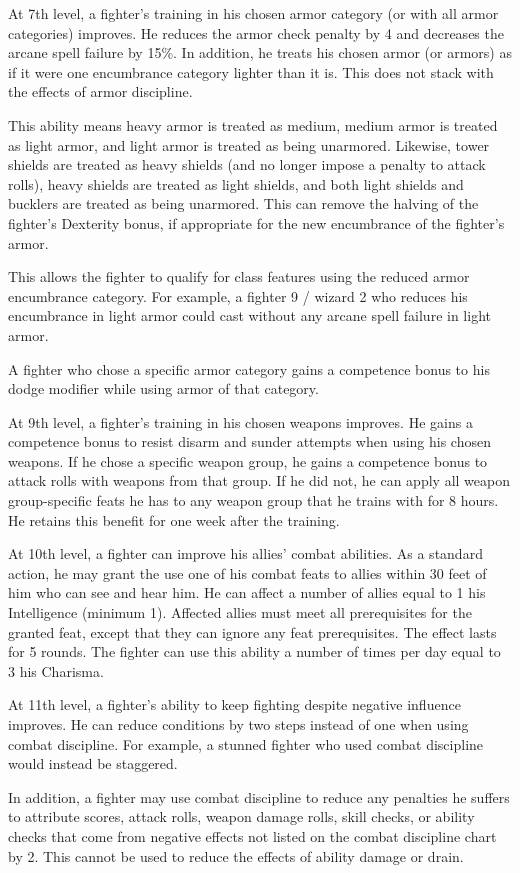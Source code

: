  At 7th level, a fighter's training in his chosen armor category (or with all armor categories) improves. He reduces the armor check penalty by 4 and decreases the arcane spell failure by 15\%. In addition, he treats his chosen armor (or armors) as if it were one encumbrance category lighter than it is. This does not stack with the effects of armor discipline.
\par This ability means heavy armor is treated as medium, medium armor is treated as light armor, and light armor is treated as being unarmored. Likewise, tower shields are treated as heavy shields (and no longer impose a  penalty to attack rolls), heavy shields are treated as light shields, and both light shields and bucklers are treated as being unarmored. This can remove the halving of the fighter's Dexterity bonus, if appropriate for the new encumbrance of the fighter's armor.
\par This allows the fighter to qualify for class features using the reduced armor encumbrance category. For example, a fighter 9 / wizard 2 who reduces his encumbrance in light armor could cast without any arcane spell failure in light armor.
\par A fighter who chose a specific armor category gains a  competence bonus to his dodge modifier while using armor of that category.

 At 9th level, a fighter's training in his chosen weapons improves. He gains a  competence bonus to resist disarm and sunder attempts when using his chosen weapons. If he chose a specific weapon group, he gains a  competence bonus to attack rolls with weapons from that group. If he did not, he can apply all weapon group-specific feats he has to any weapon group that he trains with for 8 hours. He retains this benefit for one week after the training.

 At 10th level, a fighter can improve his allies' combat abilities. As a standard action, he may grant the use one of his combat feats to allies within 30 feet of him who can see and hear him. He can affect a number of allies equal to 1 \add his Intelligence (minimum 1). Affected allies must meet all prerequisites for the granted feat, except that they can ignore any feat prerequisites. The effect lasts for 5 rounds. The fighter can use this ability a number of times per day equal to 3 \add his Charisma.

 At 11th level, a fighter's ability to keep fighting despite negative influence improves. He can reduce conditions by two steps instead of one when using combat discipline. For example, a stunned fighter who used combat discipline would instead be staggered.
\par In addition, a fighter may use combat discipline to reduce any penalties he suffers to attribute scores, attack rolls, weapon damage rolls, skill checks, or ability checks that come from negative effects not listed on the combat discipline chart by 2. This cannot be used to reduce the effects of ability damage or drain.

